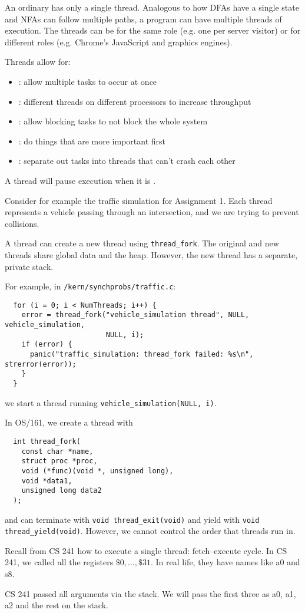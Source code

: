 An ordinary  has only a single thread.
Analogous to how DFAs have a single state and NFAs can follow multiple paths,
a program can have multiple threads of execution.
The threads can be for the same role (e.g. one per server visitor)
or for different roles (e.g. Chrome's JavaScript and graphics engines).

Threads allow for:
\begin{itemize}[nosep]
  \item {}: allow multiple tasks to occur at once
  \item {}: different threads on different processors to increase throughput
  \item {}: allow blocking tasks to not block the whole system
  \item {}: do things that are more important first
  \item {}: separate out tasks into threads that can't crash each other
\end{itemize}
A thread will pause execution when it is .

Consider for example the traffic simulation for Assignment 1.
Each thread represents a vehicle passing through an intersection,
and we are trying to prevent collisions.

A thread can create a new thread using \verb|thread_fork|.
The original and new threads share global data and the heap.
However, the new thread has a separate, private stack.

For example, in \texttt{/kern/synchprobs/traffic.c}:
\begin{verbatim}
  for (i = 0; i < NumThreads; i++) {
    error = thread_fork("vehicle_simulation thread", NULL, vehicle_simulation,
                        NULL, i);
    if (error) {
      panic("traffic_simulation: thread_fork failed: %s\n", strerror(error));
    }
  }
\end{verbatim}
we start a thread running \texttt{vehicle_simulation(NULL, i)}.

In OS/161, we create a thread with
\begin{verbatim}
  int thread_fork(
    const char *name,
    struct proc *proc,
    void (*func)(void *, unsigned long),
    void *data1,
    unsigned long data2
  );
\end{verbatim}
and can terminate with \texttt{void thread_exit(void)}
and yield with \texttt{void thread_yield(void)}.
However, we cannot control the order that threads run in.

Recall from CS 241 how to execute a single thread:
fetch--execute cycle.
In CS 241, we called all the registers $\$0,\dotsc,\$31$.
In real life, they have names like a0 and s8.

CS 241 passed all arguments via the stack.
We will pass the first three as a0, a1, a2 and the rest on the stack.
